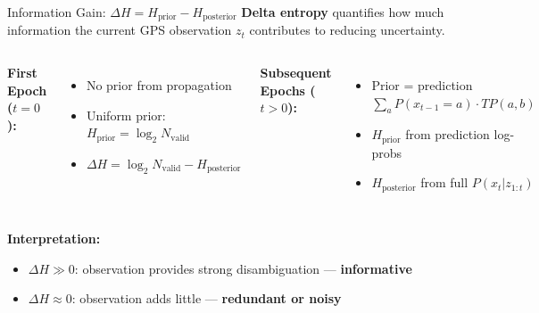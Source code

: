 \documentclass[10pt,aspectratio=169]{beamer}
\begin{document}
\begin{frame}{Information Gain: $\Delta H = H_{\text{prior}} - H_{\text{posterior}}$}
  \textbf{Delta entropy} quantifies how much information the current GPS
  observation $z_t$ contributes to reducing uncertainty.

  \vspace{0.4cm}
  \begin{columns}[T]
      \textbf{First Epoch ($t=0$):}
      \begin{itemize}
        \item No prior from propagation
        \item Uniform prior: $H_{\text{prior}} = \log_2 N_{\text{valid}}$
        \item $\Delta H = \log_2 N_{\text{valid}} - H_{\text{posterior}}$
      \end{itemize}

      \textbf{Subsequent Epochs ($t > 0$):}
      \begin{itemize}
        \item Prior = prediction $\sum_a P(x_{t-1}=a) \cdot TP(a, b)$
        \item $H_{\text{prior}}$ from prediction log-probs
        \item $H_{\text{posterior}}$ from full $P(x_t | z_{1:t})$
      \end{itemize}
  \end{columns}

  \vspace{0.5cm}
  \begin{center}
  \end{center}

  \textbf{Interpretation:}
  \begin{itemize}
    \item $\Delta H \gg 0$: observation provides strong disambiguation — \textbf{informative}
    \item $\Delta H \approx 0$: observation adds little — \textbf{redundant or noisy}
  \end{itemize}
\end{frame}
\end{document}
